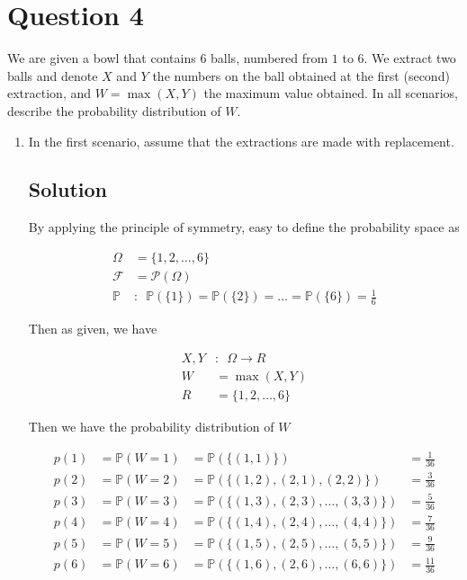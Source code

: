 \documentclass[12pt]{article}
\newcommand{\bP}{\mathbb{P}}
\begin{document}
	
	\section*{Question 4}
	
	\noindent We are given a bowl that contains $6$ balls, numbered from $1$ to $6$. We extract two balls and denote $X$ and $Y$ the numbers on the ball obtained at the first (second) extraction, and $W = \max(X,Y)$ the maximum value obtained. In all scenarios, describe the probability distribution of $W$.
	
	\bigskip
	
	\begin{enumerate}[start=1,label={\bfseries Part \arabic*:},leftmargin=0in]
		\bigskip\item In the first scenario, assume that the extractions are made with replacement.
		
		\subsection*{Solution}
		
			By applying the principle of symmetry, easy to define the probability space as
			
			\[
			\begin{aligned}
				\Omega &= \{1,2,\dots,6\}\\
				\mathcal{F} &= \mathcal{P}(\Omega)\\
				\bP &:\enspace \bP(\{1\}) = \bP(\{2\}) = \dots = \bP(\{6\}) = \frac{1}{6}
			\end{aligned}
			\]
			
			Then as given, we have
			
			\[
			\begin{aligned}
				X,Y &:\enspace \Omega \rightarrow R\\
				W &= \max(X,Y)\\
				R &= \{1,2,\dots,6\}
			\end{aligned}
			\]
			
			Then we have the probability distribution of $W$
			
			\[
			\begin{aligned}
				p(1) &= \bP(W = 1) &= \bP(\{(1,1)\}) &= \frac{1}{36}\\
				p(2) &= \bP(W = 2) &= \bP(\{(1,2),(2,1),(2,2)\}) &= \frac{3}{36}\\
				p(3) &= \bP(W = 3) &= \bP(\{(1,3),(2,3),\dots,(3,3)\}) &= \frac{5}{36}\\
				p(4) &= \bP(W = 4) &= \bP(\{(1,4),(2,4),\dots,(4,4)\}) &= \frac{7}{36}\\
				p(5) &= \bP(W = 5) &= \bP(\{(1,5),(2,5),\dots,(5,5)\}) &= \frac{9}{36}\\
				p(6) &= \bP(W = 6) &= \bP(\{(1,6),(2,6),\dots,(6,6)\}) &= \frac{11}{36}
			\end{aligned}
			\]
			

\end{enumerate}
\end{document}
